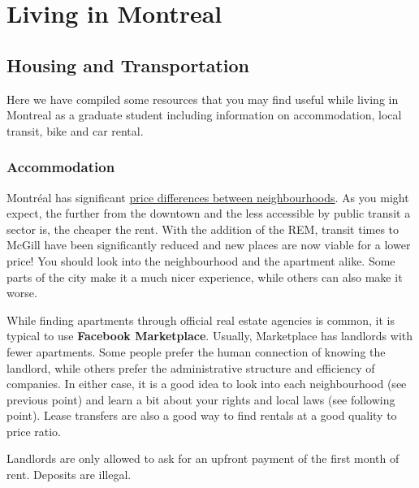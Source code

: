 

\chapter{Living in Montreal}
\section{Housing and Transportation}
Here we have compiled some resources that you may find useful while living in Montreal as a graduate student including information on accommodation, local transit, bike and car rental.

\subsection{Accommodation}
Montréal has significant \href{https://www.centris.ca/en/blog/real-estate/average-price-of-apartments-in-montreal-in-2025}{price differences between neighbourhoods}. As you might expect, the further from the downtown and the less accessible by public transit a sector is, the cheaper the rent. With the addition of the REM, transit times to McGill have been significantly reduced and new places are now viable for a lower price! You should look into the neighbourhood and the apartment alike. Some parts of the city make it a much nicer experience, while others can also make it worse. 

\noindent While finding apartments through official real estate agencies is common, it is typical to use \textbf{Facebook Marketplace}. Usually, Marketplace has landlords with fewer apartments. Some people prefer the human connection of knowing the landlord, while others prefer the administrative structure and efficiency of companies. In either case, it is a good idea to look into each neighbourhood (see previous point) and learn a bit about your rights and local laws (see following point). Lease transfers are also a good way to find rentals at a good quality to price ratio.

\begin{plainexercise}
Landlords are only allowed to ask for an upfront payment of the first month of rent. Deposits are illegal. 
\end{plainexercise} \vspace{-5pt}

